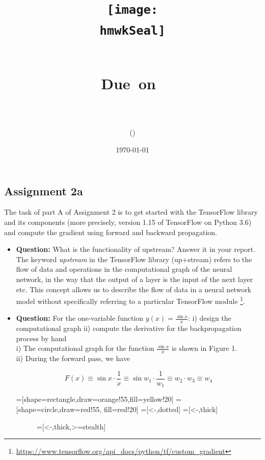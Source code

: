 \documentclass{article}
\title{
	\centering
	\texttt{[image: \\hmwkSeal]}
	
	\vspace{1in}
	\textmd{\textbf{\hmwkClass\ \hmwkTitle}}\\
	
	\normalsize\vspace{0.1in}\small{Due\ on\ \hmwkDueDate}\\
	
	\vspace{0.1in}
	\large{\textit{\hmwkClassInstructor}} \\
	\vspace{0.5in}
	
	\large{\hmwkUniversity}
	
	\vspace{3in}
	
	\author{\textbf{\hmwkAuthorName} (\hmwkAuthorID)}
	\date{\today}
}
\begin{document}
	
	\maketitle
	
	\pagebreak
	
	\subsection{Assignment 2a}
	
	The task of part A of Assignment 2 is to get started with the TensorFlow library and its components (more precisely, version 1.15 of TensorFlow on Python 3.6) and compute the gradient using forward and backward propagation. \\
	
	\begin{itemize}
		\item \textbf{Question:} What is the functionality of upstream? Answer it in your report. \\
	
	The keyword \textit{upstream} in the TensorFlow library (up+stream) refers to the flow of data and operations in the computational graph of the neural network, in the way that the output of a layer is the input of the next layer etc. This concept allows us to describe the flow of data in a neural network model without specifically referring to a particular TensorFlow module \footnote{\url{https://www.tensorflow.org/api_docs/python/tf/custom_gradient}}.
	
	\item \textbf{Question:} For the one-variable function $y(x) = \frac{\sin x }{x}$: i) design the computational graph ii) compute the derivative for the backpropagation process by hand  \\
	
	i) The computational graph for the function $\frac{\sin x}{x}$ is shown in Figure 1. \\
	
	ii) During the forward pass, we have 
	
	$$F(x) \equiv \sin x \cdot \frac{1}{x} \equiv \sin w_1 \cdot \frac{1}{w_1} \equiv w_2 \cdot w_3 \equiv w_4 $$
	
	=[shape=rectangle,draw=orange!55,fill=yellow!20]
	=[shape=circle,draw=red!55, fill=red!20]
	=[<-,dotted]
	=[<-,thick]
	
	\begin{figure}
		\centering
		=[<-,thick,>=stealth]
		\label{fig:1}
\end{figure}
\end{itemize}
\end{document}
